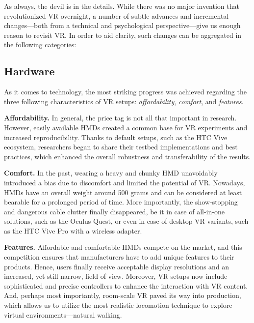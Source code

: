 As always, the devil is in the details. While there was no major invention that revolutionized VR overnight, a number of subtle advances and incremental changes---both from a technical and psychological perspective---give us enough reason to revisit VR. In order to aid clarity, such changes can be aggregated in the following categories:

\subsection{Hardware}

As it comes to technology, the most striking progress was achieved regarding the three following characteristics of VR setups: \textit{affordability}, \textit{comfort}, and \textit{features}. 

\textbf{Affordability.} In general, the price tag is not all that important in research. However, easily available HMDs created a common base for VR experiments and increased reproducibility. Thanks to default setups, such as the HTC Vive ecosystem, researchers began to share their testbed implementations and best practices, which enhanced the overall robustness and transferability of the results. 



\textbf{Comfort.} In the past, wearing a heavy and chunky HMD unavoidably introduced a bias due to discomfort and limited the potential of VR. Nowadays, HMDs have an overall weight around 500 grams and can be considered at least bearable for a prolonged period of time. More importantly, the show-stopping and dangerous cable clutter finally disappeared, be it in case of all-in-one solutions, such as the Oculus Quest, or even in case of desktop VR variants, such as the HTC Vive Pro with a wireless adapter. 





\textbf{Features.} Affordable and comfortable HMDs compete on the market, and this competition ensures that manufacturers have to add unique features to their products. Hence, users finally receive acceptable display resolutions and an increased, yet still narrow, field of view. Moreover, VR setups now include sophisticated and precise controllers to enhance the interaction with VR content. And, perhaps most importantly, room-scale VR paved its way into production, which allows us to utilize the most realistic locomotion technique to explore virtual environments---natural walking.







